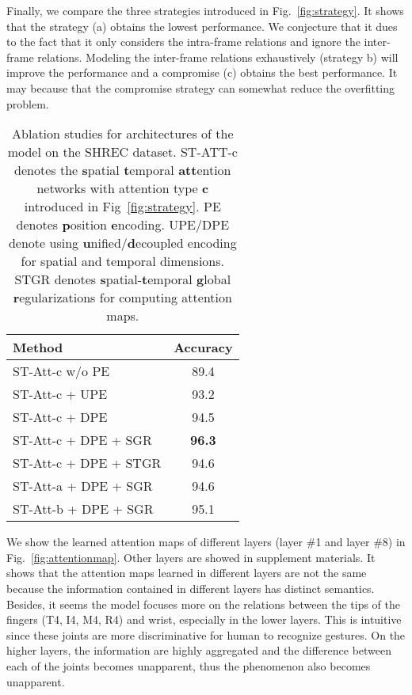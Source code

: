 \documentclass[runningheads]{llncs}
\begin{document}
Finally, we compare the three strategies introduced in Fig.~\ref{fig:strategy}. 
It shows that the strategy (a) obtains the lowest performance. 
We conjecture that it dues to the fact that it only considers the intra-frame relations and ignore the inter-frame relations. 
Modeling the inter-frame relations exhaustively (strategy b) will improve the performance and a compromise (c) obtains the best performance. 
It may because that the compromise strategy can somewhat reduce the overfitting problem. 
\begin{table}[!htp]
    \centering
    \caption{Ablation studies for architectures of the model on the SHREC dataset. 
    ST-ATT-c denotes the \textbf{s}patial \textbf{t}emporal \textbf{att}ention networks with attention type \textbf{c} introduced in Fig~\ref{fig:strategy}. 
    PE denotes \textbf{p}osition \textbf{e}ncoding. 
    UPE/DPE denote using \textbf{u}nified/\textbf{d}ecoupled encoding for spatial and temporal dimensions. 
    STGR denotes \textbf{s}patial-\textbf{t}emporal \textbf{g}lobal \textbf{r}egularizations for computing attention maps. }
    \renewcommand\tabcolsep{5.0pt} \begin{tabular}{lc}
    \hline
    Method & Accuracy \\
    \hline
    ST-Att-c w/o PE       & 89.4 \\
ST-Att-c + UPE        & 93.2 \\
    ST-Att-c + DPE        & 94.5 \\
    \hline
    ST-Att-c + DPE + SGR   & \textbf{96.3} \\
    ST-Att-c + DPE + STGR  & 94.6 \\
\hline
    ST-Att-a  + DPE + SGR    & 94.6 \\
    ST-Att-b  + DPE + SGR    & 95.1 \\
    \hline
    \end{tabular}
    \label{tab:ablation_model}
\end{table}{}

We show the learned attention maps of different layers (layer \#1 and layer \#8) in Fig.~\ref{fig:attentionmap}. 
Other layers are showed in supplement materials. 
It shows that the attention maps learned in different layers are not the same because the information contained in different layers has distinct semantics. 
Besides, it seems the model focuses more on the relations between the tips of the fingers (T4, I4, M4, R4) and wrist, especially in the lower layers. 
This is intuitive since these joints are more discriminative for human to recognize gestures. 
On the higher layers, the information are highly aggregated and the difference between each of the joints becomes unapparent, thus the phenomenon also becomes unapparent.
\end{document}
